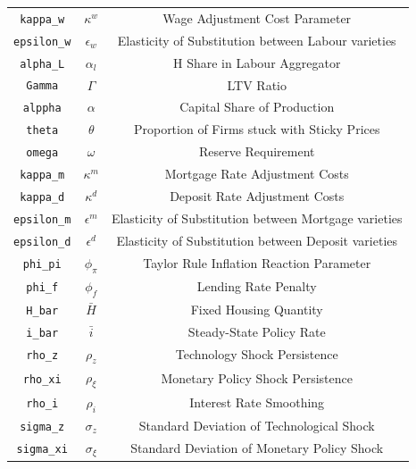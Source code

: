 \begin{center}
\begin{longtable}{ccc}
\texttt{kappa\_w} & $\kappa^w$ & Wage Adjustment Cost Parameter\\
\texttt{epsilon\_w} & $\epsilon_w$ & Elasticity of Substitution between Labour varieties\\
\texttt{alpha\_L} & $\alpha_l$ & H Share in Labour Aggregator\\
\texttt{Gamma} & $\Gamma$ & LTV Ratio\\
\texttt{alppha} & $\alpha$ & Capital Share of Production\\
\texttt{theta} & $\theta$ & Proportion of Firms stuck with Sticky Prices\\
\texttt{omega} & $\omega$ & Reserve Requirement\\
\texttt{kappa\_m} & $\kappa^m$ & Mortgage Rate Adjustment Costs\\
\texttt{kappa\_d} & $\kappa^d$ & Deposit Rate Adjustment Costs\\
\texttt{epsilon\_m} & $\epsilon^m$ & Elasticity of Substitution between Mortgage varieties\\
\texttt{epsilon\_d} & $\epsilon^d$ & Elasticity of Substitution between Deposit varieties\\
\texttt{phi\_pi} & $\phi_\pi$ & Taylor Rule Inflation Reaction Parameter\\
\texttt{phi\_f} & $\phi_f$ & Lending Rate Penalty\\
\texttt{H\_bar} & $\bar{H}$ & Fixed Housing Quantity\\
\texttt{i\_bar} & $\bar{i}$ & Steady-State Policy Rate\\
\texttt{rho\_z} & $\rho_z$ & Technology Shock Persistence\\
\texttt{rho\_xi} & $\rho_\xi$ & Monetary Policy Shock Persistence\\
\texttt{rho\_i} & $\rho_i$ & Interest Rate Smoothing\\
\texttt{sigma\_z} & $\sigma_z$ & Standard Deviation of Technological Shock\\
\texttt{sigma\_xi} & $\sigma_\xi$ & Standard Deviation of Monetary Policy Shock\\
\hline%
\end{longtable}
\end{center}
